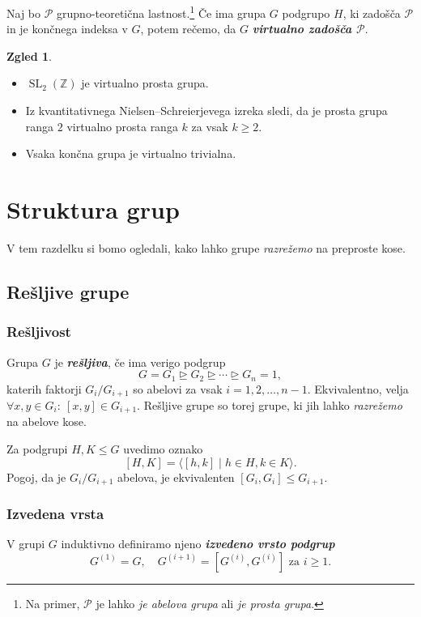 \documentclass[11pt]{book}
\def\ZZ{\mathbb{Z}}
\DeclareMathOperator\SL{SL}
\def\definicija{\color{rdeca}\bf\em}
\theoremstyle{definition}
\theoremstyle{zgled}
\newtheorem*{zgled}{Zgled}
\theoremstyle{odprtproblem}
\theoremstyle{domacanaloga}
\theoremstyle{izrek}
\begin{document}
Naj bo $\mathcal{P}$ grupno-teoretična lastnost.\footnote{Na primer, $\mathcal{P}$ je lahko {\em je abelova grupa} ali {\em je prosta grupa}.} Če ima grupa $G$ podgrupo $H$, ki zadošča $\mathcal{P}$ in je končnega indeksa v $G$, potem rečemo, da $G$ {\definicija virtualno zadošča $\mathcal{P}$}.

\begin{zgled}
\begin{itemize}
    \item $\SL_2(\ZZ)$ je virtualno prosta grupa.
    \item Iz kvantitativnega Nielsen--Schreierjevega izreka sledi, da je prosta grupa ranga $2$ virtualno prosta ranga $k$ za vsak $k \geq 2$.
    \item Vsaka končna grupa je virtualno trivialna.
\end{itemize}
\end{zgled}

\chapter{Struktura grup}

V tem razdelku si bomo ogledali, kako lahko grupe {\em razrežemo} na preproste kose.

\section{Rešljive grupe}

\subsection{Rešljivost}

Grupa $G$ je {\definicija rešljiva}, če ima verigo podgrup
\[
G = G_1 \unrhd G_2 \unrhd \cdots \unrhd G_n = 1,
\]
katerih faktorji $G_i/G_{i+1}$ so abelovi za vsak $i = 1, 2, \dots, n-1$. Ekvivalentno, velja $\forall x,y \in G_i \colon\  [x,y] \in G_{i+1}$. Rešljive grupe so torej grupe, ki jih lahko {\em razrežemo} na abelove kose.

Za podgrupi $H,K \leq G$ uvedimo oznako
\[
[H,K] = \langle [h,k] \mid h \in H, k \in K \rangle.
\]
Pogoj, da je $G_i/G_{i+1}$ abelova, je ekvivalenten $[G_i, G_i] \leq G_{i+1}$.

\subsection{Izvedena vrsta}

V grupi $G$ induktivno definiramo njeno {\definicija izvedeno vrsto podgrup}
\[
G^{(1)} = G, \quad
G^{(i+1)} = [G^{(i)}, G^{(i)}] \text{ za $i \geq 1$.}
\]
\end{document}
